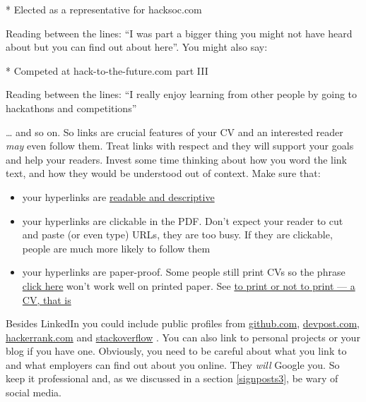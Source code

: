 \documentclass[
]{book}
\newenvironment{Shaded}{\begin{snugshade}}{\end{snugshade}}
\newcommand{\NormalTok}[1]{#1}
\newcommand{\SpecialStringTok}[1]{\textcolor[rgb]{0.31,0.60,0.02}{#1}}
\providecommand{\tightlist}{%
  \setlength{\itemsep}{0pt}\setlength{\parskip}{0pt}}
\begin{document}
\begin{Shaded}
\begin{Highlighting}[]
\SpecialStringTok{* }\NormalTok{Elected as a representative for hacksoc.com}
\end{Highlighting}
\end{Shaded}

Reading between the lines: ``I was part a bigger thing you might not have heard about but you can find out about here''. You might also say:

\begin{Shaded}
\begin{Highlighting}[]
\SpecialStringTok{* }\NormalTok{Competed at hack{-}to{-}the{-}future.com part III}
\end{Highlighting}
\end{Shaded}

Reading between the lines: ``I really enjoy learning from other people by going to hackathons and competitions''

\ldots{} and so on. So links are crucial features of your CV and an interested reader \emph{may} even follow them. Treat links with respect and they will support your goals and help your readers. Invest some time thinking about how you word the link text, and how they would be understood out of context. Make sure that:

\begin{itemize}
\tightlist
\item
  your hyperlinks are \href{https://readabilityguidelines.co.uk/content-design/links/}{readable and descriptive} \citep{readable}\\
\item
  your hyperlinks are clickable in the PDF. Don't expect your reader to cut and paste (or even type) URLs, they are too busy. If they are clickable, people are much more likely to follow them
\item
  your hyperlinks are paper-proof. Some people still print CVs so the phrase \href{https://www.w3.org/QA/Tips/noclickHere}{click here} won't work well on printed paper. See \href{https://bbc.in/3zXv6zr}{to print or not to print --- a CV, that is} \citep{printcv}
\end{itemize}

Besides LinkedIn you could include public profiles from \href{https://docs.github.com/en/free-pro-team@latest/github/setting-up-and-managing-your-github-profile/about-your-profile}{github.com}, \href{https://help.devpost.com/hc/en-us/articles/360021734632-Update-your-profile-and-username}{devpost.com}, \href{https://www.hackerrank.com/leaderboard}{hackerrank.com} and \href{https://medium.com/@rhamedy/contribution-debt-why-how-to-contribute-to-stack-overflow-a69d4bd50d0c}{stackoverflow} \citep{stackoverflow}. You can also link to personal projects or your blog if you have one. Obviously, you need to be careful about what you link to and what employers can find out about you online. They \emph{will} Google you. So keep it professional and, as we discussed in a section \ref{signposts3}, be wary of social media.
\end{document}
